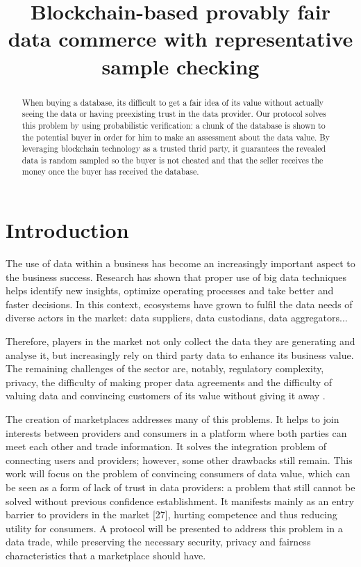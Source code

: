 \documentclass[]{article}
\title{Blockchain-based provably fair data commerce with representative sample checking}
\author{}
\begin{document}
	
	\maketitle
	
	\begin{abstract}
		When buying a database, its difficult to get a fair idea of its value without actually seeing the data or having preexisting trust in the data provider. Our protocol solves this problem by using probabilistic verification: a chunk of the database is shown to the potential buyer in order for him to make an assessment about the data value. By leveraging blockchain technology as a trusted thrid party, it guarantees the revealed data is random sampled so the buyer is not cheated and that the seller receives the money once the buyer has received the database.
	\end{abstract}
	
	\section{Introduction}
	The use of data within a business has become an increasingly important aspect to the business success. Research has shown that proper use of big data techniques helps identify new insights, optimize operating processes and take better and faster decisions. In this context, ecosystems have grown to fulfil the data needs of diverse actors in the market: data suppliers, data custodians, data aggregators... 

Therefore, players in the market not only collect the data they are generating and analyse it, but increasingly rely on third party data to enhance its business value. The remaining challenges of the sector are, notably, regulatory complexity, privacy, the difficulty of making proper data agreements and the difficulty of valuing data and convincing customers of its value without giving it away \cite{thomas16}.
	
The creation of marketplaces addresses many of this problems. It helps to join interests between providers and consumers in a platform where both parties can meet each other and trade information. It solves the integration problem of connecting users and providers; however, some other drawbacks still remain. This work will focus on the problem of convincing consumers of data value, which can be seen as a form of lack of trust in data providers: a problem that still cannot be solved without previous confidence establishment. It manifests mainly as an entry barrier to providers in the market [27], hurting competence and thus reducing utility for consumers. A protocol will be presented to address this problem in a data trade, while preserving the necessary security, privacy and fairness characteristics that a marketplace should have.
\end{document}
